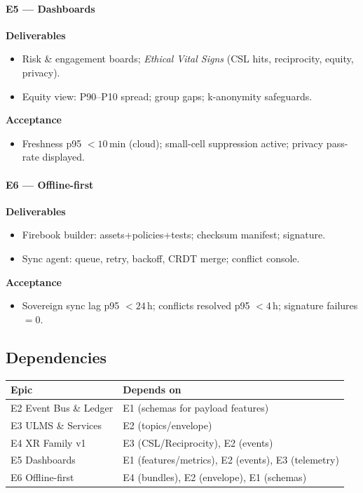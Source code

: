 \documentclass[11pt]{article}
\theoremstyle{plain}
\begin{document}
\paragraph{E5 — Dashboards}
\textbf{Deliverables}
\begin{itemize}
  \item Risk \& engagement boards; \emph{Ethical Vital Signs} (CSL hits, reciprocity, equity, privacy).
  \item Equity view: P90–P10 spread; group gaps; k-anonymity safeguards.
\end{itemize}
\textbf{Acceptance}
\begin{itemize}
  \item Freshness p95 $<10$\,min (cloud); small-cell suppression active; privacy pass-rate displayed.
\end{itemize}

\paragraph{E6 — Offline-first}
\textbf{Deliverables}
\begin{itemize}
  \item Firebook builder: assets+policies+tests; checksum manifest; signature.
  \item Sync agent: queue, retry, backoff, CRDT merge; conflict console.
\end{itemize}
\textbf{Acceptance}
\begin{itemize}
  \item Sovereign sync lag p95 $<24$\,h; conflicts resolved p95 $<4$\,h; signature failures $=0$.
\end{itemize}

\subsection{Dependencies}
\begin{center}
\begin{tabular}{l l}
\hline
Epic & Depends on \\
\hline
E2 Event Bus \& Ledger & E1 (schemas for payload features) \\
E3 ULMS \& Services & E2 (topics/envelope) \\
E4 XR Family v1 & E3 (CSL/Reciprocity), E2 (events) \\
E5 Dashboards & E1 (features/metrics), E2 (events), E3 (telemetry) \\
E6 Offline-first & E4 (bundles), E2 (envelope), E1 (schemas) \\
\hline
\end{tabular}
\end{center}
\end{document}
